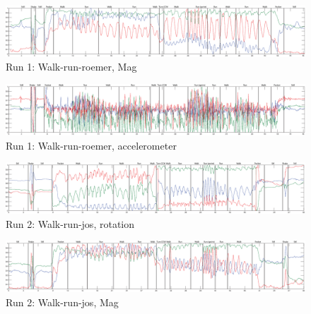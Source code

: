 \begin{figure}
\centering
  \includegraphics[width=1\textwidth]{./Figures/chapter6/data_collection/run-1-walk-run-roemer/data_plot_mag_annotated.eps}
  \caption[R1: mag]{Run 1: Walk-run-roemer, Mag}
  \label{fig:data_gathering_run_1_mag}
\end{figure}

\begin{figure}
\centering
  \includegraphics[width=1\textwidth]{./Figures/chapter6/data_collection/run-1-walk-run-roemer/data_plot_acc_annotated.eps}
  \caption[R1: accelerometer]{Run 1: Walk-run-roemer, accelerometer}
  \label{fig:data_gathering_run_1_acc}
\end{figure}

\begin{figure}
\centering
  \includegraphics[width=1\textwidth]{./Figures/chapter6/data_collection/run-2-walk-run-jos/data_plot_rot_annotated.eps}
  \caption[R2: rotation]{Run 2: Walk-run-jos, rotation}
  \label{fig:data_gathering_run_2_rot}
\end{figure}

\begin{figure}
\centering
  \includegraphics[width=1\textwidth]{./Figures/chapter6/data_collection/run-2-walk-run-jos/data_plot_mag_annotated.eps}
  \caption[R2: mag]{Run 2: Walk-run-jos, Mag}
  \label{fig:data_gathering_run_2_mag}
\end{figure}

